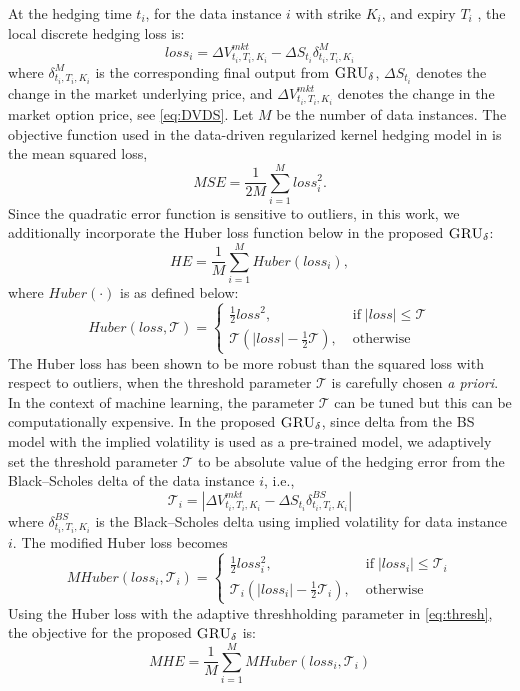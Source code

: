 \documentclass[letterpaper,12pt,titlepage,oneside,final]{book}
\numberwithin{equation}{section}
\theoremstyle{definition}
\newcommand{\model}{\textsc{GRU}_\delta}
\newcommand{\DS}{\Delta S}
\begin{document}
At the hedging time $t_i$, for the data instance $i$ with  strike $K_i$, and expiry $T_i$ , the local discrete hedging loss is:
\[
loss_i=\Delta V^{mkt}_{t_i,T_i,K_i}-\DS_{t_i} \delta^M_{{t_i,T_i,K_i}}
\]
where  $\delta^M_{{t_i,T_i,K_i}}$ is the corresponding  final output from $\model$,  $\DS_{t_i}$ denotes the change in the market underlying price, and $\Delta V^{mkt}_{t_i,T_i,K_i}$ denotes the change in the market option price,  see \eqref{eq:DVDS}.
Let $M$ be the number of data instances.
The objective function used in the data-driven regularized kernel hedging model  in \citep{knian2017} is the mean squared loss,
\begin{equation}
MSE=\frac{1}{2M} \sum_{i=1}^{M} loss_i^2.
\label{l1}
\end{equation}
Since the quadratic error function is sensitive to outliers, in this work,
we additionally incorporate the Huber loss function  \citep{Huber1964robust}  below in the proposed $\model$:
\[
HE=\frac{1}{M} \sum_{i=1}^{M} Huber(loss_i),
\]
where $Huber(\cdot)$ is as defined below:
\[
Huber(loss,\mathcal{T})=\left\{ \begin{array}{ll }
\frac{1}{2} loss^2  , \;&  \text{if} \; |loss|\leq \mathcal{T}\\
\mathcal{T}(|loss|-\frac{1}{2}\mathcal{T}), \; &\text{otherwise}
\end{array} \right.
\]
The Huber loss \citep{Huber1964robust} has been shown to be more robust than the squared loss with respect to outliers, when  the threshold parameter $\mathcal{T}$ is carefully chosen {\em a priori}.
In the context of machine learning, the parameter $\mathcal{T}$ can be tuned but this can be computationally expensive. In the proposed
$\model$, since delta from the BS model  with the implied volatility   is used as a pre-trained model, we adaptively set the threshold parameter $\mathcal{T}$ to be absolute value of the hedging error from the Black–Scholes delta of the data instance $i$, i.e.,
\begin{equation}\label{eq:thresh}
\mathcal{T}_i=|\Delta V^{mkt}_{t_i,T_i,K_i}-\DS_{t_i} \delta^{BS}_{t_i,T_i,K_i}|
\end{equation}
where $\delta^{BS}_{t_i,T_i,K_i}$ is the Black–Scholes delta using implied volatility for data instance $i$.
The modified Huber loss  becomes
\[
MHuber(loss_i,\mathcal{T}_i)=\left\{ \begin{array}{ll}
\frac{1}{2} loss_i^2  , \; &\text{if} \; |loss_i|\leq \mathcal{T}_i\\
\mathcal{T}_i(|loss_i|-\frac{1}{2}\mathcal{T}_i), \; & \text{otherwise}
\end{array} \right.
\]
Using the Huber loss with the adaptive threshholding parameter in \eqref{eq:thresh}, the objective for the proposed $\model$  is:
\begin{equation}
MHE=\frac{1}{M} \sum_{i=1}^{M} MHuber(loss_i,\mathcal{T}_i)
\label{l2}
\end{equation}
\end{document}
